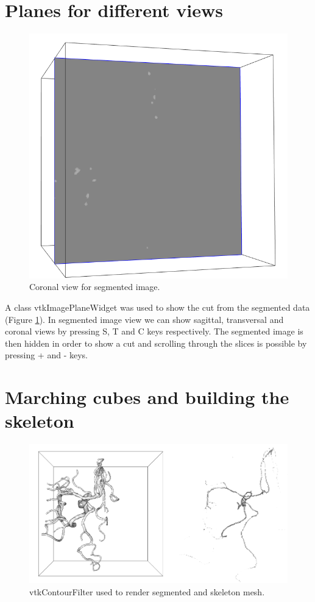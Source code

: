\section{Planes for different views}

\begin{figure}
	\centering
	\includegraphics[scale=0.3]{fig/image-plane}
	\caption{Coronal view for segmented image.}
	\label{fig:image-plane}
\end{figure}

A class vtkImagePlaneWidget was used to show the cut from the segmented data (Figure \ref{fig:image-plane}). In segmented image view we can show sagittal, transversal and coronal views by pressing S, T and C keys respectively. The segmented image is then hidden in order to show a cut and scrolling through the slices is possible by pressing + and - keys.

\section{Marching cubes and building the skeleton}

\begin{figure}
	\centering
	\includegraphics[scale=0.6]{fig/segmented-skeleton}
	\caption{vtkContourFilter used to render segmented and skeleton mesh.}
	\label{fig:segmented-skeleton}
\end{figure}

